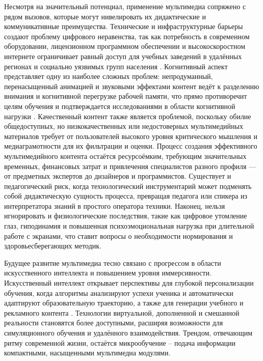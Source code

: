 \documentclass{SibFU-docs}
\begin{document}

Несмотря на значительный потенциал, применение мультимедиа сопряжено с рядом вызовов, которые могут нивелировать их дидактические и коммуникативные преимущества. Технические и инфраструктурные барьеры создают проблему цифрового неравенства, так как потребность в современном оборудовании, лицензионном программном обеспечении и высокоскоростном интернете ограничивает равный доступ для учебных заведений в удалённых регионах и социально уязвимых групп населения \cite{horizon-report}. Когнитивный аспект представляет одну из наиболее сложных проблем: непродуманный, перенасыщенный анимацией и звуковыми эффектами контент ведёт к разделению внимания и когнитивной перегрузке рабочей памяти, что прямо противоречит целям обучения и подтверждается исследованиями в области когнитивной нагрузки \cite{sweller-cognitive-load, mayer-principles}. Качественный контент также является проблемой, поскольку обилие общедоступных, но низкокачественных или недостоверных мультимедийных материалов требует от пользователей высокого уровня критического мышления и медиаграмотности для их фильтрации и оценки. Процесс создания эффективного мультимедийного контента остаётся ресурсоёмким, требующим значительных временных, финансовых затрат и привлечения специалистов разного профиля — от предметных экспертов до дизайнеров и программистов. Существует и педагогический риск, когда технологический инструментарий может подменять собой дидактическую сущность процесса, превращая педагога или спикера из интерпретатора знаний в простого оператора техники. Наконец, нельзя игнорировать и физиологические последствия, такие как цифровое утомление глаз, гиподинамия и повышенная психоэмоциональная нагрузка при длительной работе с экранами, что ставит вопросы о необходимости нормирования и здоровьесберегающих методик.


Будущее развитие мультимедиа тесно связано с прогрессом в области искусственного интеллекта и повышением уровня иммерсивности. Искусственный интеллект открывает перспективы для глубокой персонализации обучения, когда алгоритмы анализируют успехи ученика и автоматически адаптируют образовательную траекторию, а также для генерации учебного и рекламного контента \cite{horizon-report}. Технологии виртуальной, дополненной и смешанной реальности становятся более доступными, расширяя возможности для симуляционного обучения и удалённого взаимодействия. Трендом, отвечающим ритму современной жизни, остаётся микрообучение – подача информации компактными, насыщенными мультимедиа модулями.
\end{document}
